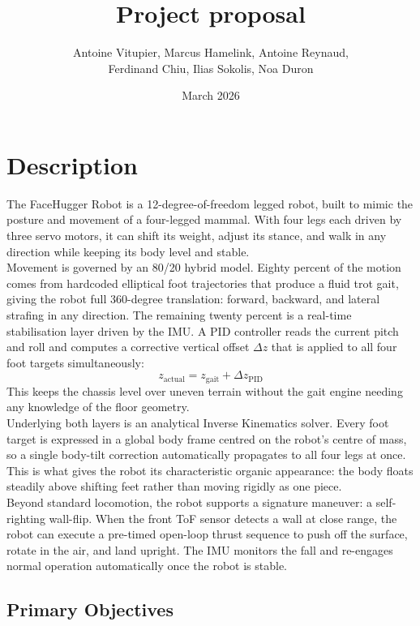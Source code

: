 \documentclass{article}
\title{Project proposal}
\author{Antoine Vitupier, Marcus Hamelink, Antoine Reynaud, \\ Ferdinand Chiu, Ilias Sokolis, Noa Duron}
\date{March 2026}
\begin{document}
\maketitle

\section{Description}

The FaceHugger Robot is a 12-degree-of-freedom legged robot, built to mimic the posture and movement of a four-legged mammal. With four legs each driven by three servo motors, it can shift its weight, adjust its stance, and walk in any direction while keeping its body level and stable. \\

Movement is governed by an 80/20 hybrid model. Eighty percent of the motion comes from hardcoded elliptical foot trajectories that produce a fluid trot gait, giving the robot full 360-degree translation: forward, backward, and lateral strafing in any direction. The remaining twenty percent is a real-time stabilisation layer driven by the IMU. A PID controller reads the current pitch and roll and computes a corrective vertical offset
$\Delta z$ that is applied to all four foot targets simultaneously:
\[
  z_{\mathrm{actual}} = z_{\mathrm{gait}} + \Delta z_{\mathrm{PID}}
\]
This keeps the chassis level over uneven terrain without the gait engine needing any knowledge of the floor geometry. \\

Underlying both layers is an analytical Inverse Kinematics solver. Every foot target is expressed in a global body frame centred on the robot's centre of mass, so a single body-tilt correction automatically propagates to all four legs at once. This is what
gives the robot its characteristic organic appearance: the body floats steadily above shifting feet rather than moving rigidly as one piece. \\

Beyond standard locomotion, the robot supports a signature maneuver: a self-righting wall-flip. When the front ToF sensor detects a wall at close range, the robot can execute a pre-timed open-loop thrust sequence to push off the surface, rotate in the air, and land upright. The IMU monitors the fall and re-engages normal operation automatically once the robot is stable. \\

\subsection*{Primary Objectives}
\end{document}
